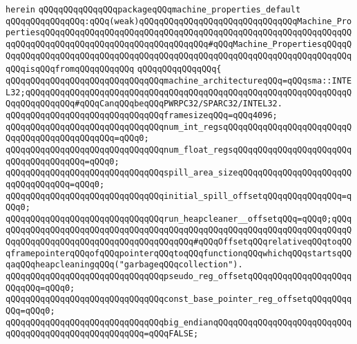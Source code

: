 \verb|herein|\newline
\verb|qQQqqQQqqQQqqQQqpackageqQQqmachine_properties_default|\newline
\verb|qQQqqQQqqQQqqQQq:qQQq(weak)qQQqqQQqqQQqqQQqqQQqqQQqqQQqqQQqMachine_PropertiesqQQqqQQqqQQqqQQqqQQqqQQqqQQqqQQqqQQqqQQqqQQqqQQqqQQqqQQqqQQqqQQqqQQqqQQqqQQqqQQqqQQqqQQqqQQqqQQqqQQqqQQq#qQQqMachine_PropertiesqQQqqQQqqQQqqQQqqQQqqQQqqQQqqQQqqQQqqQQqqQQqqQQqqQQqqQQqqQQqqQQqqQQqqQQqqQQqqQQqisqQQqfromqQQqqQQqqQQq|\newline
\verb|qQQqqQQqqQQqqQQq{|\newline
\verb|qQQqqQQqqQQqqQQqqQQqqQQqqQQqqQQqmachine_architectureqQQq=qQQqsma::INTEL32;qQQqqQQqqQQqqQQqqQQqqQQqqQQqqQQqqQQqqQQqqQQqqQQqqQQqqQQqqQQqqQQqqQQqqQQqqQQqqQQq#qQQqCanqQQqbeqQQqPWRPC32/SPARC32/INTEL32.|\newline
\newline
\verb|qQQqqQQqqQQqqQQqqQQqqQQqqQQqqQQqframesizeqQQq=qQQq4096;|\newline
\newline
\newline
\verb|qQQqqQQqqQQqqQQqqQQqqQQqqQQqqQQqnum_int_regsqQQqqQQqqQQqqQQqqQQqqQQqqQQqqQQqqQQqqQQqqQQqqQQq=qQQq0;|\newline
\verb|qQQqqQQqqQQqqQQqqQQqqQQqqQQqqQQqnum_float_regsqQQqqQQqqQQqqQQqqQQqqQQqqQQqqQQqqQQqqQQq=qQQq0;|\newline
\verb|qQQqqQQqqQQqqQQqqQQqqQQqqQQqqQQqspill_area_sizeqQQqqQQqqQQqqQQqqQQqqQQqqQQqqQQqqQQq=qQQq0;|\newline
\verb|qQQqqQQqqQQqqQQqqQQqqQQqqQQqqQQqinitial_spill_offsetqQQqqQQqqQQqqQQq=qQQq0;|\newline
\verb|qQQqqQQqqQQqqQQqqQQqqQQqqQQqqQQqrun_heapcleaner__offsetqQQq=qQQq0;qQQqqQQqqQQqqQQqqQQqqQQqqQQqqQQqqQQqqQQqqQQqqQQqqQQqqQQqqQQqqQQqqQQqqQQqqQQqqQQqqQQqqQQqqQQqqQQqqQQqqQQqqQQqqQQq#qQQqOffsetqQQqrelativeqQQqtoqQQqframepointerqQQqofqQQqpointerqQQqtoqQQqfunctionqQQqwhichqQQqstartsqQQqaqQQqheapcleaningqQQq("garbageqQQqcollection").|\newline
\verb|qQQqqQQqqQQqqQQqqQQqqQQqqQQqqQQqpseudo_reg_offsetqQQqqQQqqQQqqQQqqQQqqQQqqQQq=qQQq0;|\newline
\verb|qQQqqQQqqQQqqQQqqQQqqQQqqQQqqQQqconst_base_pointer_reg_offsetqQQqqQQqqQQq=qQQq0;|\newline
\newline
\verb|qQQqqQQqqQQqqQQqqQQqqQQqqQQqqQQqbig_endianqQQqqQQqqQQqqQQqqQQqqQQqqQQqqQQqqQQqqQQqqQQqqQQqqQQqqQQq=qQQqFALSE;|\newline
